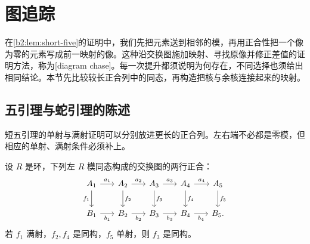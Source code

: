 
\section{图追踪}
\label{b2:sec:0304}

在\cref{b2:lem:short-five}的证明中，我们先把元素送到相邻的模，再用正合性把一个像为零的元素写成前一映射的像。这种沿交换图施加映射、寻找原像并修正差值的证明方法，称为[diagram chase]。每一次提升都须说明为何存在，不同选择也须给出相同结论。本节先比较较长正合列中的同态，再构造把核与余核连接起来的映射。

%
%
%

\subsection{五引理与蛇引理的陈述}
\label{b2:subsec:0304:01}

短五引理的单射与满射证明可以分别放进更长的正合列。左右端不必都是零模，但相应的单射、满射条件必须补上。

\begin{theorem}[五引理]\label{b2:thm:five-lemma}
	设 \(R\) 是环，下列左 \(R\) 模同态构成的交换图的两行正合：
	\[
		\begin{tikzcd}[column sep=1.7em,row sep=2em]
			A_1\arrow[r,"a_1"]\arrow[d,"f_1"']&A_2\arrow[r,"a_2"]\arrow[d,"f_2"]&A_3\arrow[r,"a_3"]\arrow[d,"f_3"]&A_4\arrow[r,"a_4"]\arrow[d,"f_4"]&A_5\arrow[d,"f_5"]\\
			B_1\arrow[r,"b_1"']&B_2\arrow[r,"b_2"']&B_3\arrow[r,"b_3"']&B_4\arrow[r,"b_4"']&B_5.
		\end{tikzcd}
	\]
	若 \(f_1\) 满射，\(f_2,f_4\) 是同构，\(f_5\) 单射，则 \(f_3\) 是同构。
\end{theorem}

